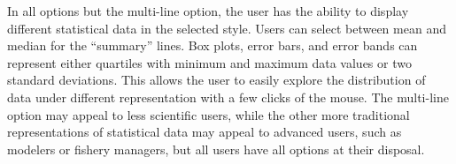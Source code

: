 In all options but the multi-line option, the user has the ability to display different statistical data in the selected style.  Users can select between mean and median for the ``summary'' lines.  Box plots, error bars, and error bands can represent either quartiles with minimum and maximum data values or two standard deviations.  This allows the user to easily explore the distribution of data under different representation with a few clicks of the mouse.  The multi-line option may appeal to less scientific users, while the other more traditional representations of statistical data may appeal to advanced users, such as modelers or fishery managers, but all users have all options at their disposal.

